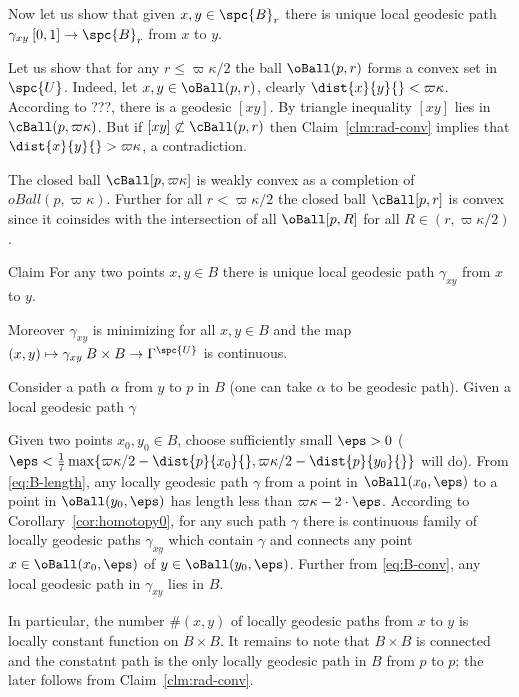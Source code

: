 Now let us show that given $x,y\in \spc{B}_r$ there is unique local geodesic path $\gamma_{xy}\:[0,1]\to \spc{B}_r$ from $x$ to $y$.









Let us show that for any $ r\le\varpi\kappa/2$ the ball $\oBall(p, r)$ forms a convex set in $\spc{U}$.
Indeed, let $x,y\in\oBall(p, r)$, clearly $\dist{x}{y}{}<\varpi\kappa$.
According to ???, there is a geodesic $[xy]$.
By triangle inequality $[xy]$ lies in $\cBall(p,\varpi\kappa)$.
But if $[xy]\not\subset\cBall(p, r)$ then Claim~\ref{clm:rad-conv} implies that $\dist{x}{y}{}>\varpi\kappa$, a contradiction.

The closed ball $\cBall[p,\varpi\kappa]$ is weakly convex as a completion of $oBall(p,\varpi\kappa)$.
Further for all $r<\varpi\kappa/2$ the closed ball
$\cBall[p,r]$ is convex since it coinsides with the intersection of all 
$\oBall[p,R]$ for all $R\in(r,\varpi\kappa/2)$.








\begin{clm}{Claim}\label{clm:unique-lgp}
For any two points $x,y\in B$ there is unique local geodesic path $\gamma_{xy}$ from $x$ to $y$.

Moreover $\gamma_{xy}$ is minimizing for all $x,y\in B$ 
and the map 
$(x,y)\mapsto \gamma_{xy}\:B\times B\to\Gamma^\spc{U}$ is continuous.
\end{clm}

Consider a path $\alpha$ from $y$ to $p$ in $B$
(one can take $\alpha$ to be geodesic path).
Given a local geodesic path $\gamma$  


Given two points $x_0,y_0\in B$,  choose sufficiently small $\eps>0$
($\eps<\tfrac1{7}\max\{\varpi\kappa/2-\dist{p}{x_0}{},\varpi\kappa/2-\dist{p}{y_0}{}\}$ will do).
From \ref{eq:B-length}, any locally geodesic path $\gamma$
from a point in $\oBall(x_0,\eps)$ to a point in $\oBall(y_0,\eps)$ has length less than $\varpi\kappa-2\cdot\eps$.
According to Corollary~\ref{cor:homotopy0}, 
for any such path $\gamma$ 
there is continuous family of locally geodesic paths $\gamma_{xy}$ 
which contain $\gamma$ and connects any point $x\in\oBall(x_0,\eps)$ of $y\in\oBall(y_0,\eps)$.
Further from \ref{eq:B-conv}, any local geodesic path in $\gamma_{xy}$ lies in $B$.

In particular, the number $\#(x,y)$ 
of locally geodesic paths from $x$ to $y$ is locally constant function on $B\times B$.
It remains to note that $B\times B$ is connected 
and the constatnt path is the only locally geodesic path in $B$ from $p$ to $p$;
the later follows from Claim~\ref{clm:rad-conv}.
\qeds


